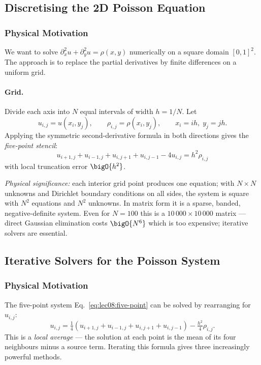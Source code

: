 \subsection{Discretising the 2D Poisson Equation}
\label{subsec:lec08:poisson-discretisation}

\subsubsection*{Physical Motivation}
We want to solve
$\partial^2_x u + \partial^2_y u = \rho(x,y)$
numerically on a square domain $[0,1]^2$.  The approach is to
replace the partial derivatives by finite differences on a uniform
grid.

\paragraph{Grid.}
Divide each axis into $N$ equal intervals of width $h=1/N$.  Let
\begin{equation}
  u_{i,j} = u(x_i,y_j),
  \qquad
  \rho_{i,j} = \rho(x_i,y_j),
  \qquad
  x_i = ih,\;y_j = jh.
  \label{eq:lec08:grid}
\end{equation}
Applying the symmetric second-derivative formula in both directions
gives the \emph{five-point stencil}:
\begin{equation}
  \boxed{
  u_{i+1,j}+u_{i-1,j}+u_{i,j+1}+u_{i,j-1}-4u_{i,j}
  = h^2\rho_{i,j}}
  \label{eq:lec08:five-point}
\end{equation}
with local truncation error $\bigO{h^2}$.

\textit{Physical significance:} each interior grid point produces one
equation; with $N\times N$ unknowns and Dirichlet boundary conditions
on all sides, the system is square with $N^2$ equations and $N^2$
unknowns.  In matrix form it is a sparse, banded, negative-definite
system.  Even for $N=100$ this is a $10\,000\times10\,000$ matrix —
direct Gaussian elimination costs $\bigO{N^6}$ which is too
expensive; iterative solvers are essential.

\subsection{Iterative Solvers for the Poisson System}
\label{subsec:lec08:iterative}

\subsubsection*{Physical Motivation}
The five-point system Eq.~\eqref{eq:lec08:five-point} can be solved
by rearranging for $u_{i,j}$:
\begin{equation}
  u_{i,j}
  = \tfrac{1}{4}\!\left(
      u_{i+1,j}+u_{i-1,j}+u_{i,j+1}+u_{i,j-1}
    \right)
    -\tfrac{h^2}{4}\rho_{i,j}.
  \label{eq:lec08:jacobi-update}
\end{equation}
This is a \emph{local average} — the solution at each point is the
mean of its four neighbours minus a source term.  Iterating this
formula gives three increasingly powerful methods.

